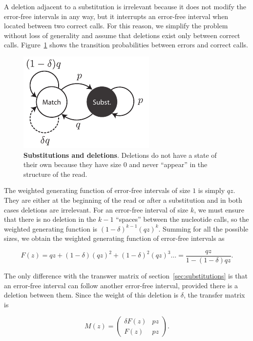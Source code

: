 \documentclass{article}
\begin{document}
A deletion adjacent to a substitution is irrelevant because it does not
modify the error-free intervals in any way, but it interrupts an
error-free interval when located between two correct calls. For this
reason, we simplify the problem without loss of generality and assume that
deletions exist only between correct calls. Figure~\ref{fig:deletions}
shows the transition probabilities between errors and correct calls.

\begin{figure}[h]
\centering
\includegraphics[scale=0.9]{deletions.pdf}
\caption{\textbf{Substitutions and deletions}. 
Deletions do not have a state of their own because they have size $0$ and
never ``appear'' in the structure of the read.}
\label{fig:deletions}
\end{figure}

The weighted generating function of error-free intervals of size $1$ is
simply $qz$. They are either at the beginning of the read or after a
substitution and in both cases deletions are irrelevant. For an error-free
interval of size $k$, we must ensure that there is no deletion in the
$k-1$ ``spaces'' between the nucleotide calls, so the weighted generating
function is $(1-\delta)^{k-1}(qz)^k$. Summing for all the possible sizes,
we obtain the weighted generating function of error-free intervals as

\begin{equation}
\label{eq:Fdel}
F(z) = qz + (1-\delta)(qz)^2 + (1-\delta)^2(qz)^3 \ldots =
\frac{qz}{1-(1-\delta)qz}.
\end{equation}

The only difference with the transwer matrix of
section~\ref{sec:substitutions} is that an error-free interval can follow
another error-free interval, provided there is a deletion between them.
Since the weight of this deletion is $\delta$, the transfer matrix is

\begin{equation*}
M(z) = \left(
\begin{matrix}
\delta F(z) & pz \\
F(z)        & pz
\end{matrix}
\right).
\end{equation*}
\end{document}

